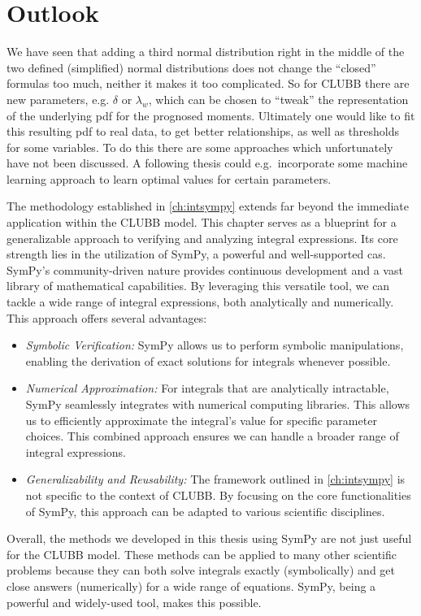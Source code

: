 \chapter{Outlook}\label{ch:outlook}

We have seen that adding a third normal distribution right in the middle of the two defined (simplified) normal distributions does not change the \enquote{closed} formulas too much, neither it makes it too complicated.
So for \gls{CLUBB} there are new parameters, e.g. $\delta$ or $\lambda_w$, which can be chosen to \enquote{tweak} the representation of the underlying \gls{pdf} for the prognosed moments.
Ultimately one would like to fit this resulting \gls{pdf} to real data, to get better relationships, as well as thresholds for some variables.
To do this there are some approaches which unfortunately have not been discussed.
A following thesis could e.g.\ incorporate some machine learning approach to learn optimal values for certain parameters.

The methodology established in \cref{ch:intsympy} extends far beyond the immediate application within the \gls{CLUBB} model.
This chapter serves as a blueprint for a generalizable approach to verifying and analyzing integral expressions.
Its core strength lies in the utilization of SymPy, a powerful and well-supported \gls{cas}.
SymPy's community-driven nature provides continuous development and a vast library of mathematical capabilities.
By leveraging this versatile tool, we can tackle a wide range of integral expressions, both analytically and numerically.
This approach offers several advantages:
\begin{itemize}
    \item \emph{Symbolic Verification:}
    SymPy allows us to perform symbolic manipulations, enabling the derivation of exact solutions for integrals whenever possible.
    \item \emph{Numerical Approximation:}
    For integrals that are analytically intractable, SymPy seamlessly integrates with numerical computing libraries.
    This allows us to efficiently approximate the integral's value for specific parameter choices.
    This combined approach ensures we can handle a broader range of integral expressions.
    \item \emph{Generalizability and Reusability:} The framework outlined in \cref{ch:intsympy} is not specific to the context of \gls{CLUBB}.
    By focusing on the core functionalities of SymPy, this approach can be adapted to various scientific disciplines.
\end{itemize}
Overall, the methods we developed in this thesis using SymPy are not just useful for the \gls{CLUBB} model.
These methods can be applied to many other scientific problems because they can both solve integrals exactly (symbolically) and get close answers (numerically) for a wide range of equations.
SymPy, being a powerful and widely-used tool, makes this possible.